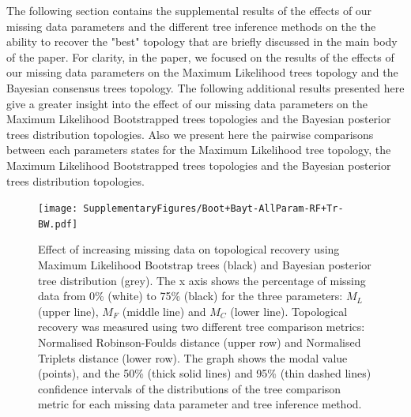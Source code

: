 The following section contains the supplemental results of the effects of our missing data parameters and the different tree inference methods on the the ability to recover the "best" topology that are briefly discussed in the main body of the paper. For clarity, in the paper, we focused on the results of the effects of our missing data parameters on the Maximum Likelihood trees topology and the Bayesian consensus trees topology. The following additional results presented here give a greater insight into the effect of our missing data parameters on the Maximum Likelihood Bootstrapped trees topologies and the Bayesian posterior trees distribution topologies. Also we present here the pairwise comparisons between each parameters states for the Maximum Likelihood tree topology, the Maximum Likelihood Bootstrapped trees topologies and the Bayesian posterior trees distribution topologies.

\begin{figure} 
\centering
    \texttt{[image: SupplementaryFigures/Boot+Bayt-AllParam-RF+Tr-BW.pdf]}
    \caption{Effect of increasing missing data on topological recovery using Maximum Likelihood Bootstrap trees (black) and Bayesian posterior tree distribution (grey). The x axis shows the percentage of missing data from 0\% (white) to 75\% (black) for the three parameters: $M_{L}$ (upper line), $M_{F}$ (middle line) and $M_{C}$ (lower line). Topological recovery was measured using two different tree comparison metrics: Normalised Robinson-Foulds distance (upper row) and Normalised Triplets distance (lower row). The graph shows the modal value (points), and the 50\% (thick solid lines) and 95\% (thin dashed lines) confidence intervals of the distributions of the tree comparison metric for each missing data parameter and tree inference method.} 
\label{Fig_Supp_BootBayt_allparam} 
\end{figure}

